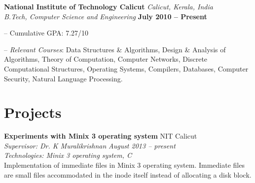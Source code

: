 \documentclass[margin,line]{resume}
\begin{document}
\begin{resume}
    \textbf{National Institute of Technology Calicut} \hfill \textit{Calicut, Kerala, India} \vspace{1mm}\\\vspace{1mm}%
    \textsl{B.Tech, Computer Science and Engineering} \hfill \textbf{ July 2010 -- Present}\vspace{-3mm}\\\vspace{-1mm}%
    \begin{list2}
        \item[--] Cumulative GPA: 7.27/10 
        \item[--] \textit{Relevant Courses}: Data Structures \& Algorithms, Design \& Analysis of Algorithms, Theory
of Computation, Computer Networks, Discrete Computational Structures, Operating Systems, 
Compilers, Databases, Computer Security, Natural Language Processing.
    \end{list2}\vspace{-1.5mm}
    
%   
%
%    
%
%    
   

    \section{\mysidestyle Projects}

   
	
	
    \textbf{Experiments with Minix 3 operating system } 				\hfill NIT Calicut \\
      \textit{Supervisor: Dr. K Muralikrishnan } 			\hfill \textit{August 2013 -- present}\\
      \textit{Technologies: Minix 3 operating system, C }\\
    Implementation of immediate files in Minix 3 operating system. Immediate files are small files accommodated in the inode itself instead of allocating a disk block. 


\end{resume}
\end{document}
